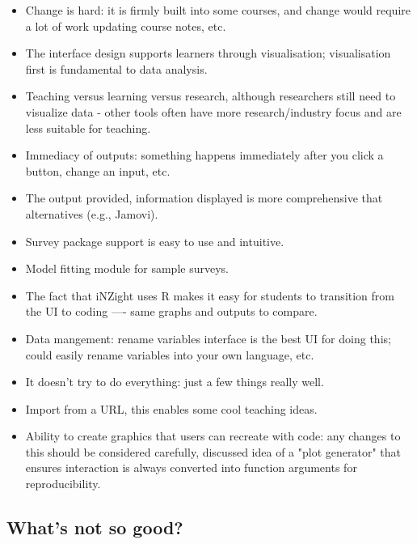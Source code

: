 \documentclass{article}
\begin{document}
\begin{itemize}
    \item Change is hard: it is firmly built into some courses, and change would require a lot of work updating course notes, etc.
    \item The interface design supports learners through visualisation; visualisation first is fundamental to data analysis.
    \item Teaching versus learning versus research, although researchers still need to visualize data - other tools often have more research/industry focus and are less suitable for teaching.
    \item Immediacy of outputs: something happens immediately after you click a button, change an input, etc.
    \item The output provided, information displayed is more comprehensive that alternatives (e.g., Jamovi).
    \item Survey package support is easy to use and intuitive.
    \item Model fitting module for sample surveys.
    \item The fact that iNZight uses R makes it easy for students to transition from the UI to coding ---- same graphs and outputs to compare.
    \item Data mangement: rename variables interface is the best UI for doing this; could easily rename variables into your own language, etc.
    \item It doesn't try to do everything: just a few things really well.
    \item Import from a URL, this enables some cool teaching ideas.
    \item Ability to create graphics that users can recreate with code: any changes to this should be considered carefully, discussed idea of a "plot generator" that ensures interaction is always converted into function arguments for reproducibility.
\end{itemize}

\subsection{What's not so good?}
\end{document}
